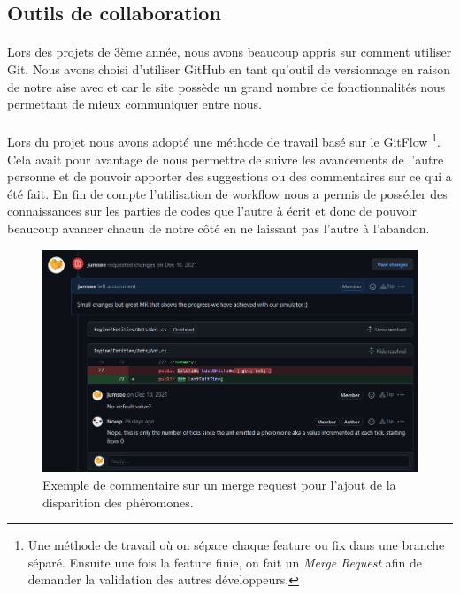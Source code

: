 \documentclass{EPUProjetDi}
\begin{document}
\subsection{Outils de collaboration}

\paragraph{}
Lors des projets de 3ème année, nous avons beaucoup appris sur comment utiliser
Git. Nous avons choisi d'utiliser GitHub en tant qu'outil de versionnage en raison de notre aise avec et
car le site possède un grand nombre de fonctionnalités nous permettant de mieux communiquer entre
nous.

\paragraph{}
Lors du projet nous avons adopté une méthode de travail basé sur le GitFlow 
\footnote{Une méthode de travail où on sépare chaque feature ou fix dans une branche séparé.
Ensuite une fois la feature finie, on fait un \textit{Merge Request} afin de demander la validation des autres développeurs.}. 
Cela avait pour avantage de nous permettre de suivre les avancements de l'autre personne et de pouvoir 
apporter des suggestions ou des commentaires sur ce qui a été fait. 
En fin de compte l'utilisation de workflow nous a permis de posséder des connaissances sur 
les parties de codes que l'autre à écrit et donc de pouvoir beaucoup avancer chacun de notre
côté en ne laissant pas l'autre à l'abandon.

\begin{figure}[h!]
\centering
\includegraphics[scale=.5]{MergeRequest.png}
\caption{Exemple de commentaire sur un merge request pour l'ajout de la disparition des phéromones.}
\label{fig:MergeRequest}
\end{figure}
\end{document}
